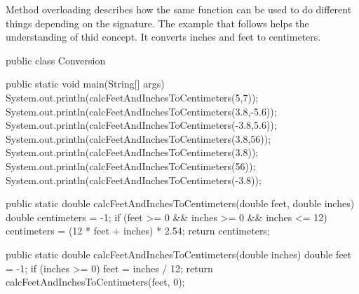 Method overloading describes how the same function can be used to do different things depending on
the signature. The example that follows helps the understanding of thid concept. It converts inches
and feet to centimeters.
\begin{listing}{1}
public class Conversion {
    public static void main(String[] args) {
    System.out.println(calcFeetAndInchesToCentimeters(5,7));
    System.out.println(calcFeetAndInchesToCentimeters(3.8,-5.6));
    System.out.println(calcFeetAndInchesToCentimeters(-3.8,5.6));
    System.out.println(calcFeetAndInchesToCentimeters(3.8,56));
    System.out.println(calcFeetAndInchesToCentimeters(3.8));
    System.out.println(calcFeetAndInchesToCentimeters(56));
    System.out.println(calcFeetAndInchesToCentimeters(-3.8));
    }

    public static double calcFeetAndInchesToCentimeters(double feet, double inches) {
    double centimeters = -1; 
    if (feet >= 0 && inches >= 0 && inches <= 12) {
    centimeters = (12 * feet + inches) * 2.54;
    }
    return centimeters;
    }

    public static double calcFeetAndInchesToCentimeters(double inches) {
    double feet = -1; 
    if (inches >= 0) {
    feet = inches / 12;
    }
    return calcFeetAndInchesToCentimeters(feet, 0);
    }

}
\end{listing}
